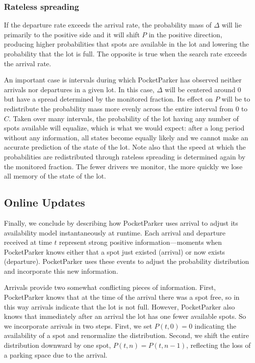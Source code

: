 \subsubsection{Rateless spreading}

If the departure rate exceeds the arrival rate, the probability mass of
$\Delta$ will lie primarily to the positive side and it will shift $P$ in the
positive direction, producing higher probabilities that spots are available
in the lot and lowering the probability that the lot is full. The opposite is
true when the search rate exceeds the arrival rate.

An important case is intervals during which PocketParker has observed neither
arrivals nor departures in a given lot. In this case, $\Delta$ will be
centered around $0$ but have a spread determined by the monitored fraction.
Its effect on $P$ will be to redistribute the probability mass more evenly
across the entire interval from $0$ to $C$. Taken over many intervals, the
probability of the lot having any number of spots available will equalize,
which is what we would expect: after a long period without any information,
all states become equally likely and we cannot make an accurate prediction of
the state of the lot. Note also that the speed at which the probabilities are
redistributed through rateless spreading is determined again by the monitored
fraction. The fewer drivers we monitor, the more quickly we lose all memory
of the state of the lot.

\subsection{Online Updates}

Finally, we conclude by describing how PocketParker uses arrival to adjust
its availability model instantaneously at runtime. Each arrival and departure
received at time $t$ represent strong positive information---moments when
PocketParker knows either that a spot just existed (arrival) or now exists
(departure). PocketParker uses these events to adjust the probability
distribution and incorporate this new information. 

Arrivals provide two somewhat conflicting pieces of information. First,
PocketParker knows that at the time of the arrival there was a spot free, so
in this way arrivals indicate that the lot is not full. However, PocketParker
also knows that immediately after an arrival the lot has one fewer available
spots. So we incorporate arrivals in two steps. First, we set $P(t, 0) = 0$
indicating the availability of a spot and renormalize the distribution.
Second, we shift the entire distribution downward by one spot, $P(t, n) =
P(t, n - 1)$, reflecting the loss of a parking space due to the arrival.

